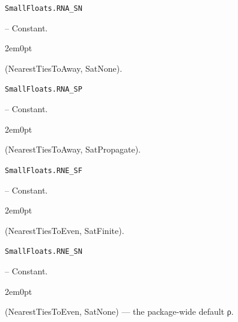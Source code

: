 \par\medskip\noindent\begin{minipage}{\linewidth}
\hypertarget{1497742833584286063}{\texttt{SmallFloats.RNA\_\allowbreak{}SN}}  -- {Constant.}
\nopagebreak
\begin{adjustwidth}{2em}{0pt}

(NearestTiesToAway, SatNone).



\end{adjustwidth}
\end{minipage}
\par\medskip

\par\medskip\noindent\begin{minipage}{\linewidth}
\hypertarget{9868279548188878236}{\texttt{SmallFloats.RNA\_\allowbreak{}SP}}  -- {Constant.}
\nopagebreak
\begin{adjustwidth}{2em}{0pt}

(NearestTiesToAway, SatPropagate).



\end{adjustwidth}
\end{minipage}
\par\medskip

\par\medskip\noindent\begin{minipage}{\linewidth}
\hypertarget{3026972477457364217}{\texttt{SmallFloats.RNE\_\allowbreak{}SF}}  -- {Constant.}
\nopagebreak
\begin{adjustwidth}{2em}{0pt}

(NearestTiesToEven, SatFinite).



\end{adjustwidth}
\end{minipage}
\par\medskip

\par\medskip\noindent\begin{minipage}{\linewidth}
\hypertarget{10331688225281198727}{\texttt{SmallFloats.RNE\_\allowbreak{}SN}}  -- {Constant.}
\nopagebreak
\begin{adjustwidth}{2em}{0pt}

(NearestTiesToEven, SatNone) — the package-wide default ρ.



\end{adjustwidth}
\end{minipage}
\par\medskip

